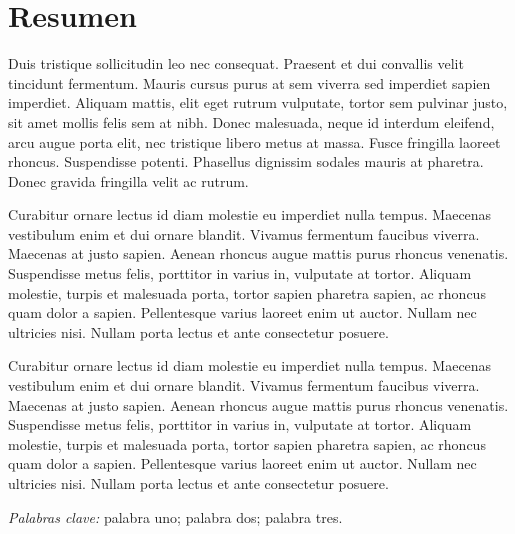 %


\chapter{Resumen} %
\noindent
Duis tristique sollicitudin leo nec consequat. Praesent et dui convallis velit tincidunt fermentum. Mauris cursus purus at sem viverra sed imperdiet sapien imperdiet. Aliquam mattis, elit eget rutrum vulputate, tortor sem pulvinar justo, sit amet mollis felis sem at nibh. Donec malesuada, neque id interdum eleifend, arcu augue porta elit, nec tristique libero metus at massa. Fusce fringilla laoreet rhoncus. Suspendisse potenti. Phasellus dignissim sodales mauris at pharetra. Donec gravida fringilla velit ac rutrum.

Curabitur ornare lectus id diam molestie eu imperdiet nulla tempus. Maecenas vestibulum enim et dui ornare blandit. Vivamus fermentum faucibus viverra. Maecenas at justo sapien. Aenean rhoncus augue mattis purus rhoncus venenatis. Suspendisse metus felis, porttitor in varius in, vulputate at tortor. Aliquam molestie, turpis et malesuada porta, tortor sapien pharetra sapien, ac rhoncus quam dolor a sapien. Pellentesque varius laoreet enim ut auctor. Nullam nec ultricies nisi. Nullam porta lectus et ante consectetur posuere.


Curabitur ornare lectus id diam molestie eu imperdiet nulla tempus. Maecenas vestibulum enim et dui ornare blandit. Vivamus fermentum faucibus viverra. Maecenas at justo sapien. Aenean rhoncus augue mattis purus rhoncus venenatis. Suspendisse metus felis, porttitor in varius in, vulputate at tortor. Aliquam molestie, turpis et malesuada porta, tortor sapien pharetra sapien, ac rhoncus quam dolor a sapien. Pellentesque varius laoreet enim ut auctor. Nullam nec ultricies nisi. Nullam porta lectus et ante consectetur posuere.


\bigskip
\noindent
\textit{Palabras clave:} palabra uno; palabra dos; palabra tres.

\checklanguage
\endinput 